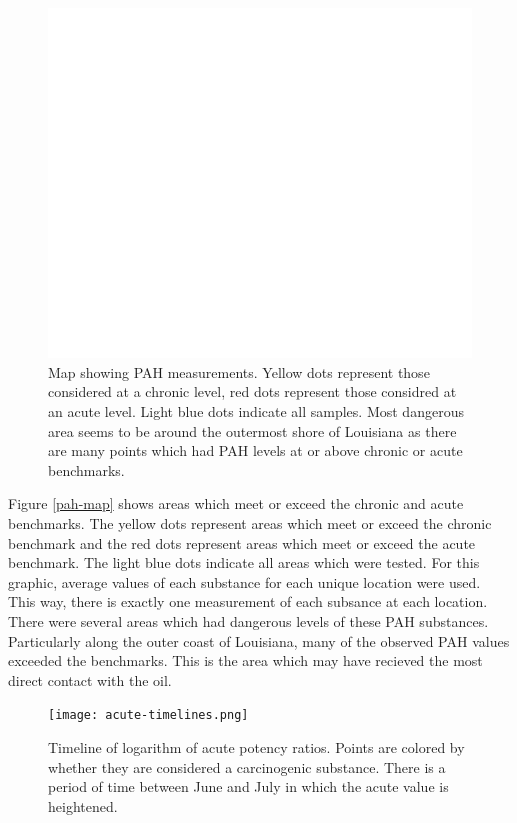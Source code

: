 \documentclass[11pt]{article}
\begin{document}
\begin{figure}[htbp] %
   \centering
   \includegraphics[width=5in]{chron-acute-map.png} 
   \caption{Map showing PAH measurements. Yellow dots represent those considered at a chronic level, red dots represent those considred at an acute level.  Light blue dots indicate all samples.  Most dangerous area seems to be around the outermost shore of Louisiana as there are many points which had PAH levels at or above chronic or acute benchmarks.}
   \label{pah-map }
\end{figure}


Figure \ref{pah-map} shows areas which meet or exceed the chronic and acute benchmarks.  The yellow dots represent areas which meet or exceed the chronic benchmark and the red dots represent areas which meet or exceed the acute benchmark.  The light blue dots indicate all areas which were tested.  For this graphic, average values of each substance for each unique location were used.  This way, there is exactly one measurement of each subsance at each location.  There were several areas which had dangerous levels of these PAH substances.  Particularly along the outer coast of Louisiana, many of the observed PAH values exceeded the benchmarks.  This is the area which may have recieved the most direct contact with the oil.  

\begin{figure}[htbp] %
   \centering
   \texttt{[image: acute-timelines.png]} 
   \caption{Timeline of logarithm of acute potency ratios.  Points are colored by whether they are considered a carcinogenic substance. There is a period of time between June and July in which the acute value is heightened.}
   \label{pah-timeline}
\end{figure}
\end{document}
